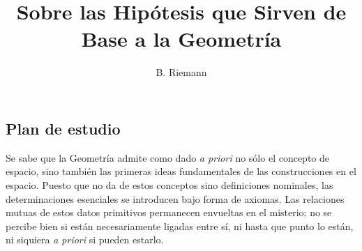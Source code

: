 \documentclass[a4paper, 12pt]{article}
\title{Sobre las Hipótesis que Sirven de Base a la Geometría}
\author{B. Riemann}
\date{}
\begin{document}
\begin{tcolorbox}[colback=blue!5!white,colframe=blue!75!black]

\vspace{-1.8cm}
\textbf \maketitle

\end{tcolorbox}

\bigskip




\subsection*{Plan de estudio}


Se sabe que la Geometría admite como dado \textit{a priori} no sólo el concepto de espacio, sino  también las primeras ideas fundamentales de las construcciones en el espacio.  Puesto que no da de estos conceptos sino definiciones nominales, las determinaciones esenciales se introducen bajo forma de axiomas.  Las relaciones mutuas de estos datos primitivos permanecen envueltas en el misterio; no se percibe bien si están necesariamente ligadas entre sí, ni hasta que punto lo están, ni siquiera \textit{a priori} si pueden estarlo.
\end{document}
